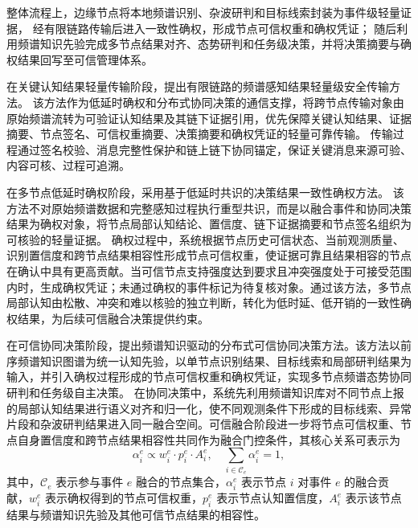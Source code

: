整体流程上，边缘节点将本地频谱识别、杂波研判和目标线索封装为事件级轻量证据，
经有限链路传输后进入一致性确权，形成节点可信权重和确权凭证；
随后利用频谱知识先验完成多节点结果对齐、态势研判和任务级决策，并将决策摘要与确权结果回写至可信管理体系。

在关键认知结果轻量传输阶段，提出有限链路的频谱感知结果轻量级安全传输方法。
该方法作为低延时确权和分布式协同决策的通信支撑，将跨节点传输对象由原始频谱流转为可验证认知结果及其链下证据引用，优先保障关键认知结果、证据摘要、节点签名、可信权重摘要、决策摘要和确权凭证的轻量可靠传输。
传输过程通过签名校验、消息完整性保护和链上链下协同锚定，保证关键消息来源可验、内容可核、过程可追溯。

在多节点低延时确权阶段，采用基于低延时共识的决策结果一致性确权方法。
该方法不对原始频谱数据和完整感知过程执行重型共识，而是以融合事件和协同决策结果为确权对象，将节点局部认知结论、置信度、链下证据摘要和节点签名组织为可核验的轻量证据。
确权过程中，系统根据节点历史可信状态、当前观测质量、识别置信度和跨节点结果相容性形成节点可信权重，使证据可靠且结果相容的节点在确认中具有更高贡献。当可信节点支持强度达到要求且冲突强度处于可接受范围内时，生成确权凭证；未通过确权的事件标记为待复核对象。通过该方法，多节点局部认知由松散、冲突和难以核验的独立判断，转化为低时延、低开销的一致性确权结果，为后续可信融合决策提供约束。

在可信协同决策阶段，提出频谱知识驱动的分布式可信协同决策方法。该方法以前序频谱知识图谱为统一认知先验，以单节点识别结果、目标线索和局部研判结果为输入，并引入确权过程形成的节点可信权重和确权凭证，实现多节点频谱态势协同研判和任务级自主决策。
在协同决策中，系统先利用频谱知识库对不同节点上报的局部认知结果进行语义对齐和归一化，使不同观测条件下形成的目标线索、异常片段和杂波研判结果进入同一融合空间。可信融合阶段进一步将节点可信权重、节点自身置信度和跨节点结果相容性共同作为融合门控条件，其核心关系可表示为
\begin{equation}
\alpha_i^e\propto w_i^e\cdot p_i^e\cdot A_i^e,
\quad
\sum_{i\in\mathcal{C}_e}\alpha_i^e=1,
\end{equation}
其中，$\mathcal{C}_e$ 表示参与事件 $e$ 融合的节点集合，$\alpha_i^e$ 表示节点 $i$ 对事件 $e$ 的融合贡献，$w_i^e$ 表示确权得到的节点可信权重，$p_i^e$ 表示节点认知置信度，$A_i^e$ 表示该节点结果与频谱知识先验及其他可信节点结果的相容性。

